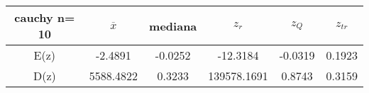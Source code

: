 \begin{tabular}{|c|c|c|c|c|c|}
\hline
cauchy n= 10& $\overline{x}$ & mediana & $z_r$ & $z_Q$ & $z_{tr}$ \\ \hline
E(z) & -2.4891 & -0.0252 & -12.3184 & -0.0319 & 0.1923 \\ \hline
D(z) & 5588.4822 & 0.3233 & 139578.1691 & 0.8743 & 0.3159 \\ \hline
\end{tabular}